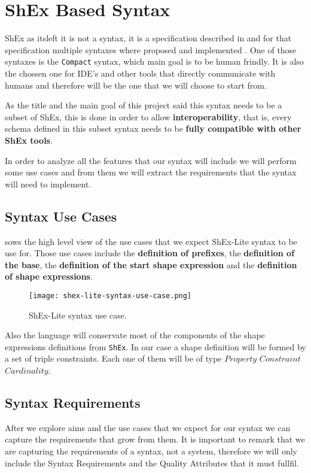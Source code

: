 \section{ShEx Based Syntax}

ShEx as itsleft it is not a syntax, it is a specification described in  
and for that specification multiple syntaxes where proposed and implemented .
One of those syntaxes is the \texttt{Compact} syntax, which main goal is to be human frindly. It is also
the chossen one for IDE's and other tools that directly communicate with humans and therefore will be the
one that we will choose to start from.

As the title and the main goal of this project said this syntax needs to be a subset of ShEx, this is done
in order to allow \textbf{interoperability}, that is, every schema defined in this subset syntax needs to be
\textbf{fully compatible with other ShEx tools}.

In order to analyze all the features that our syntax will include we will perform some use cases and from
them we will extract the requirements that the syntax will need to implement.

\subsection{Syntax Use Cases}

 sows the high level view of the use cases that we expect ShEx-Lite syntax
to be use for. Those use cases include the \textbf{definition of prefixes}, the \textbf{definition of the base},
the \textbf{definition of the start shape expression} and the \textbf{definition of shape expressions}.

\begin{figure*}[h!]
	\texttt{[image: shex-lite-syntax-use-case.png]}
	\caption[ShEx-Lite syntax use case]{ShEx-Lite syntax use case.}
\end{figure*}

Also the language will conservate most of the components of the shape expressions definitions from \texttt{ShEx}.
In our case a shape definition will be formed by a set of triple constraints. Each one of them will be of type
$Property$ $Constraint$ $Cardinality$.

\subsection{Syntax Requirements}
After we explore aims and the use cases that we expect for our syntax we can capture the requirements that grow
from them. It is important to remark that we are capturing the requirements of a syntax, not a system, therefore
we will only include the Syntax Requirements and the Quality Attributes that it must fullfil.


